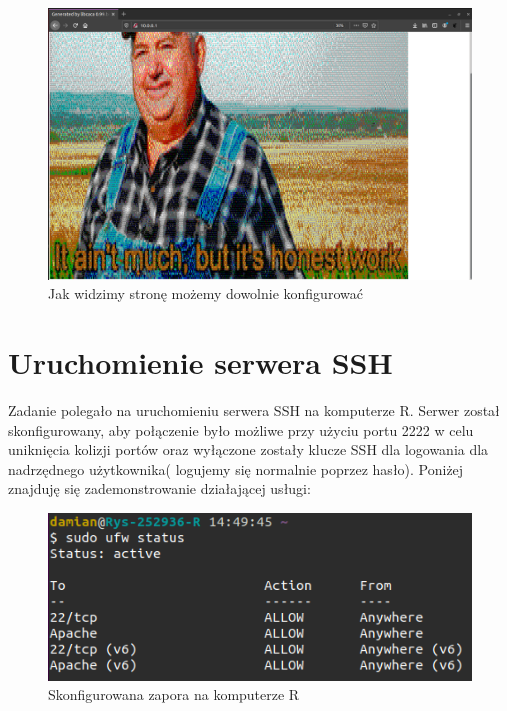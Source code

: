 \documentclass{article}
\begin{document}
\begin{figure}[H]
    \centering
    \includegraphics[totalheight=6cm]{6.WWW/5jK32TG.png}  
    \caption{Jak widzimy stronę możemy dowolnie konfigurować}
    \label{2}
\end{figure}

\section{Uruchomienie serwera SSH}
Zadanie polegało na uruchomieniu serwera SSH na komputerze R. Serwer został skonfigurowany, aby połączenie było możliwe przy użyciu portu 2222 w celu uniknięcia kolizji portów oraz wyłączone zostały klucze SSH dla logowania dla nadrzędnego użytkownika( logujemy się normalnie poprzez hasło). Poniżej znajduję się zademonstrowanie działającej usługi:
\newpage
\begin{figure}[H]
    \centering
    \includegraphics[scale = 0.72]{6.WWW/2yeHK9Z.png}  
    \caption{Skonfigurowana zapora na komputerze R}
    \label{2}
\end{figure}
\end{document}
